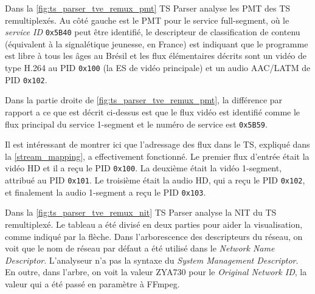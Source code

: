 \documentclass[12pt,a4paper]{article}
\begin{document}

Dans la \autoref{fig:ts_parser_tve_remux_pmt} TS Parser analyse les PMT des TS remultiplexés. Au côté gauche est le PMT pour le service full-segment, où le \textit{service ID} \texttt{0x5B40} peut être identifié, le descripteur de classification de contenu (équivalent à la signalétique jeunesse, en France) est indiquant que le programme  est libre à tous les âges au Brésil et les flux élémentaires décrits sont un vidéo de type H.264 au PID \texttt{0x100} (la ES de vidéo principale) et un audio AAC/LATM de PID \texttt{0x102}.

Dans la partie droite de \autoref{fig:ts_parser_tve_remux_pmt}, la différence par rapport a ce que est décrit ci-dessus est que le flux vidéo est identifié comme le flux principal du service 1-segment et le numéro de service est \texttt{0x5B59}.

Il est intéressant de montrer ici que l'adressage des flux dans le TS, expliqué dans la \autoref{stream_mapping}, a effectivement fonctionné. Le premier flux d'entrée était la vidéo HD et il a reçu le PID \texttt{0x100}. La deuxième était la vidéo 1-segment, attribué au PID \texttt{0x101}. Le troisième était la audio HD, qui a reçu le PID \texttt{0x102}, et finalement la audio 1-segment a reçu le PID \texttt{0x103}.

Dans la \autoref{fig:ts_parser_tve_remux_nit} TS Parser analyse la NIT du TS remultiplexé. Le tableau a été divisé en deux parties pour aider la visualisation, comme indiqué par la flèche. Dans l'arborescence des descripteurs du réseau, on voit que le nom de réseau par défaut a été utilisé dans le \textit{Network Name Descriptor}. L'analyseur n'a pas la syntaxe du \textit{System Management Descriptor}. En outre, dans l'arbre, on voit la valeur ZYA730 pour le \textit{Original Network ID}, la valeur qui a été passé en paramètre à FFmpeg.

\end{document}
